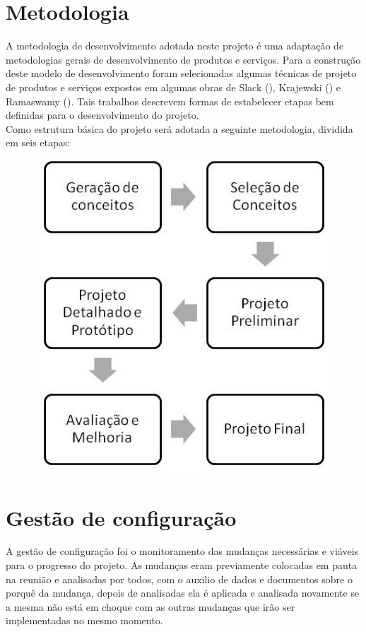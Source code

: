 \section*{Metodologia}
A metodologia de desenvolvimento adotada neste projeto é uma adaptação de metodologias gerais de desenvolvimento
de produtos e serviços. Para a construção deste modelo de desenvolvimento foram selecionadas algumas técnicas de
projeto de produtos e serviços expostos em algumas obras de Slack (\citeyear{slack99}), Krajewski (\citeyear{krajewski96}) e Ramaswamy (\citeyear{ramaswamy96}).
Tais trabalhos descrevem formas de estabelecer etapas bem definidas para o desenvolvimento do projeto.\\
Como estrutura básica do projeto será adotada a seguinte metodologia, dividida em seis etapas:
\begin{figure}[h]
\centering
\includegraphics[scale=0.5]{editaveis/figuras/metodologia_de_desenvolvimento}
\end{figure}

\section*{Gestão de configuração}
A gestão de configuração foi o monitoramento das mudanças necessárias e viáveis para o progresso do projeto. As mudanças eram previamente colocadas em pauta na reunião e analisadas por todos, com o auxilio de dados e documentos sobre o porquê da mudança, depois de analisadas ela é aplicada e analisada novamente se a mesma não está em choque com as outras mudanças que  irão ser implementadas no mesmo momento.

